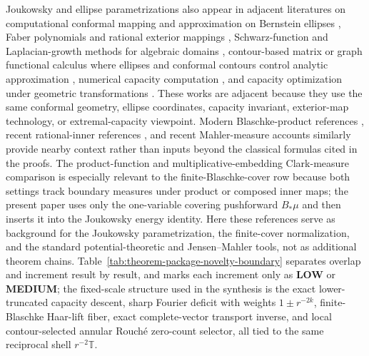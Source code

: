 \documentclass[12pt,a4paper]{article}
\theoremstyle{plain}
\theoremstyle{definition}
\numberwithin{equation}{section}
\newcommand{\TT}{\mathbb{T}}
\begin{document}
Joukowsky and ellipse parametrizations also appear in adjacent literatures on computational conformal mapping and approximation on Bernstein ellipses \citep{Henrici1974,Trefethen2013}, Faber polynomials and rational exterior mappings \citep{Faber1903,Curtiss1971,Liesen2001,LevenbergWielonsky2020}, Schwarz-function and Laplacian-growth methods for algebraic domains \citep{GustafssonVasiliev2006,Eynard2016}, contour-based matrix or graph functional calculus where ellipses and conformal contours control analytic approximation \citep{HaleHighamTrefethen2008}, numerical capacity computation \citep{LiesenSeteNasser2017,BaddooTrefethen2021,LiesenNasserSete2023}, and capacity optimization under geometric transformations \citep{Laugesen2022,ClarkLaugesen2025}.  These works are adjacent because they use the same conformal geometry, ellipse coordinates, capacity invariant, exterior-map technology, or extremal-capacity viewpoint.  Modern Blaschke-product references \citep{GarciaMashreghiRoss2017,GarciaMashreghiRoss2018}, recent rational-inner references \citep{FelderLe2022,BickelCimaSola2023,Bergqvist2023,AndersonBergqvistBickelCimaSola2024,Jacobsson2024ClarkProduct,Knese2024RationalInnerSurvey,BickelKnesePascoeSola2025}, and recent Mahler-measure accounts \citep{BrunaultZudilin2020,McKeeSmyth2021} similarly provide nearby context rather than inputs beyond the classical formulas cited in the proofs.  The product-function and multiplicative-embedding Clark-measure comparison \citep{Jacobsson2024ClarkProduct} is especially relevant to the finite-Blaschke-cover row because both settings track boundary measures under product or composed inner maps; the present paper uses only the one-variable covering pushforward \(B_\ast\mu\) and then inserts it into the Joukowsky energy identity.  Here these references serve as background for the Joukowsky parametrization, the finite-cover normalization, and the standard potential-theoretic and Jensen--Mahler tools, not as additional theorem chains.  Table~\ref{tab:theorem-package-novelty-boundary} separates overlap and increment result by result, and marks each increment only as \textbf{LOW} or \textbf{MEDIUM}; the fixed-scale structure used in the synthesis is the exact lower-truncated capacity descent, sharp Fourier deficit with weights \(1\pm r^{-2k}\), finite-Blaschke Haar-lift fiber, exact complete-vector transport inverse, and local contour-selected annular Rouch\'e zero-count selector, all tied to the same reciprocal shell \(r^{-2}\TT\).
\end{document}

